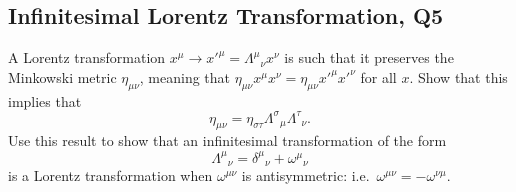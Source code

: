 \subsection{Infinitesimal Lorentz Transformation, Q5}
A Lorentz transformation $x^\mu \to x'^\mu = \Lambda^\mu{}_\nu x^\nu$ is such that it preserves the Minkowski metric $\eta_{\mu\nu}$, meaning that $\eta_{\mu\nu}x^\mu x^\nu = \eta_{\mu\nu}x'^\mu x'^\nu$ for all $x$. Show that this implies that
\begin{equation}
    \eta_{\mu\nu} = \eta_{\sigma\tau}\Lambda^\sigma{}_\mu\Lambda^\tau{}_\nu.
\end{equation}
Use this result to show that an infinitesimal transformation of the form
\begin{equation}
    \Lambda^\mu{}_\nu = \delta^\mu{}_\nu + \omega^\mu{}_\nu
\end{equation}
is a Lorentz transformation when $\omega^{\mu\nu}$ is antisymmetric: i.e.\ $\omega^{\mu\nu} = -\omega^{\nu\mu}$.

